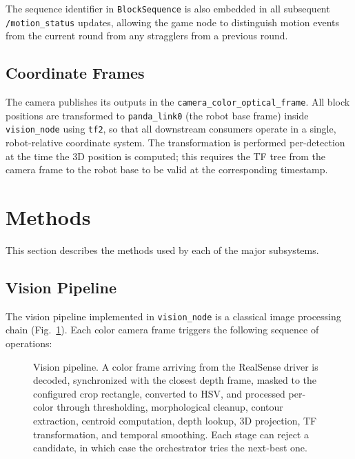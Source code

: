 \documentclass[conference]{IEEEtran}
\begin{document}
The sequence identifier in \texttt{BlockSequence} is also embedded in
all subsequent \texttt{/motion\_status} updates, allowing the game node
to distinguish motion events from the current round from any stragglers
from a previous round.

\subsection{Coordinate Frames}

The camera publishes its outputs in the \texttt{camera\_color\_optical\_frame}.
All block positions are transformed to \texttt{panda\_link0} (the robot
base frame) inside \texttt{vision\_node} using \texttt{tf2}, so that
all downstream consumers operate in a single, robot-relative coordinate
system. The transformation is performed per-detection at the time the
3D position is computed; this requires the TF tree from the camera
frame to the robot base to be valid at the corresponding timestamp.

\section{Methods}
\label{sec:methods}

This section describes the methods used by each of the major subsystems.

\subsection{Vision Pipeline}
\label{sec:vision}

The vision pipeline implemented in \texttt{vision\_node} is a classical
image processing chain (Fig.~\ref{fig:vision_pipeline}). Each color
camera frame triggers the following sequence of operations:

\begin{figure}[t]
\centering
\fbox{\rule{0pt}{6cm}\rule{0.85\columnwidth}{0pt}}
\caption{Vision pipeline. A color frame arriving from the RealSense
driver is decoded, synchronized with the closest depth frame, masked
to the configured crop rectangle, converted to HSV, and processed
per-color through thresholding, morphological cleanup, contour
extraction, centroid computation, depth lookup, 3D projection, TF
transformation, and temporal smoothing. Each stage can reject a
candidate, in which case the orchestrator tries the next-best one.}
\label{fig:vision_pipeline}
\end{figure}
\end{document}
